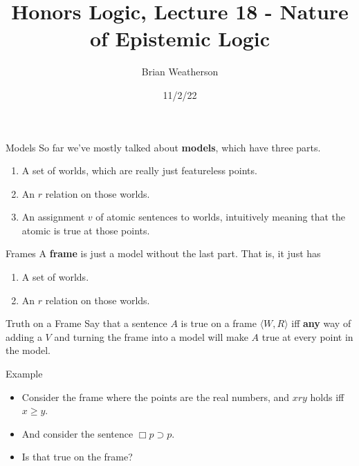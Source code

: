 \documentclass[
  14pt,
  letterpaper,
  ignorenonframetext,
  handout]{beamer}
\title{Honors Logic, Lecture 18 - Nature of Epistemic Logic}
\author{Brian Weatherson}
\date{11/2/22}
\providecommand{\tightlist}{%
  \setlength{\itemsep}{0pt}\setlength{\parskip}{0pt}}\usepackage{longtable,booktabs,array}
\begin{document}
\frame{\titlepage}
\ifdefined\Shaded\renewenvironment{Shaded}{\begin{tcolorbox}[sharp corners, borderline west={3pt}{0pt}{shadecolor}, interior hidden, frame hidden, enhanced, breakable, boxrule=0pt]}{\end{tcolorbox}}\fi

\begin{frame}{Models}
\protect\hypertarget{models}{}
So far we've mostly talked about \textbf{models}, which have three
parts.

\begin{enumerate}
\tightlist
\item
  A set of worlds, which are really just featureless points.
\item
  An \(r\) relation on those worlds.
\item
  An assignment \(v\) of atomic sentences to worlds, intuitively meaning
  that the atomic is true at those points.
\end{enumerate}
\end{frame}

\begin{frame}{Frames}
\protect\hypertarget{frames}{}
A \textbf{frame} is just a model without the last part. That is, it just
has

\begin{enumerate}
\tightlist
\item
  A set of worlds.
\item
  An \(r\) relation on those worlds.
\end{enumerate}
\end{frame}

\begin{frame}{Truth on a Frame}
\protect\hypertarget{truth-on-a-frame}{}
Say that a sentence \(A\) is true on a frame \(\langle W, R \rangle\)
iff \textbf{any} way of adding a \(V\) and turning the frame into a
model will make \(A\) true at every point in the model.
\end{frame}

\begin{frame}{Example}
\protect\hypertarget{example}{}
\begin{itemize}
\tightlist
\item
  Consider the frame where the points are the real numbers, and \(xry\)
  holds iff \(x \geq y\).
\item
  And consider the sentence \(\Box p \supset p\).
\item
  Is that true on the frame?
\end{itemize}
\end{frame}
\end{document}

